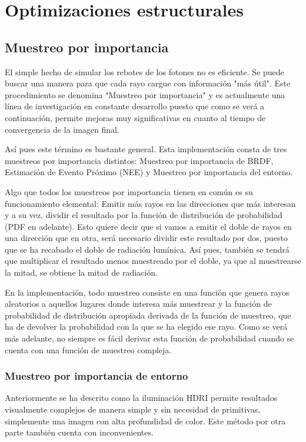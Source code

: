 \chapter{Optimizaciones estructurales}
	
\section{Muestreo por importancia}


El simple hecho de simular los rebotes de los fotones no es eficiente. Se puede buscar una manera para que cada rayo cargue con información "más útil". Este procedimiento se denomina "Muestreo por importancia" y es actualmente una línea de investigación en constante desarrollo puesto que como se verá a continuación, permite mejoras muy significativas en cuanto al tiempo de convergencia de la imagen final.

Así pues este término es bastante general. Esta implementación consta de tres muestreos por importancia distintos: Muestreo por importancia de BRDF, Estimación de Evento Próximo (NEE) y Muestreo por importancia del entorno.

Algo que todos los muestreos por importancia tienen en común es su funcionamiento elemental: Emitir más rayos en las direcciones que más interesan y a su vez, dividir el resultado por la función de distribución de probabilidad (PDF en adelante). Esto quiere decir que si vamos a emitir el doble de rayos en una dirección que en otra, será necesario dividir este resultado por dos, puesto que se ha recabado el doble de radiación lumínica. Así pues, también se tendrá que multiplicar el resultado menos muestreado por el doble, ya que al muestrearse la mitad, se obtiene la mitad de radiación.

En la implementación, todo muestreo consiste en una función que genera rayos aleatorios a aquellos lugares donde interesa más muestrear y la función de probabilidad de distribución apropiada derivada de la función de muestreo, que ha de devolver la probabilidad con la que se ha elegido ese rayo. Como se verá más adelante, no siempre es fácil derivar esta función de probabilidad cuando se cuenta con una función de muestreo compleja.


\subsection{Muestreo por importancia de entorno}
	
Anteriormente se ha descrito como la iluminación HDRI permite resultados visualmente complejos de manera simple y sin necesidad de primitivas, simplemente una imagen con alta profundidad de color. Este método por otra parte también cuenta con inconvenientes. 

